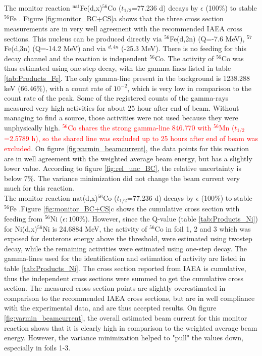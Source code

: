 \noindent
The monitor reaction  $^\text{nat}$Fe(d,x)$^{56}$Co ($t_{1/2}$=77.236 d) decays by $\epsilon$ (100\%) to stable $^{56}$Fe \cite{Junde2011}. Figure \ref{fig:monitor_BC+CS}a shows that the three cross section measurements are in very well agreement with the recommended IAEA cross sections\cite{Hermanne2018a}. This nucleus can be produced directly via $^{56}$Fe(d,2n) (Q=-7.6 MeV), $^{57}$Fe(d,3n) (Q=-14.2 MeV) and via $^{d,4n}$ (-25.3 MeV). There is no feeding for this decay channel and the reaction is independent $^{56}$Co. The activity of $^{56}$Co was thus estimated using one-step decay, with the gamma-lines listed in table \ref{tab:Products_Fe}. The only gamma-line present in the background is 1238.288 keV (66.46\%), with a count rate of $10^{-2}$, which is very low in comparison to the count rate of the peak. Some of the registered counts of the gamma-rays measured very high activities for about 25 hour after end of beam. Without managing to find a source, those activities were not used because they were unphysically high. \textcolor{red}{$^{56}$Co shares the strong gamma-line 846.770 with $^{56}$Mn ($t_{1/2}$=2.5789 h), so the shared line was excluded up to 25 hours after end of beam was excluded}. On figure \ref{fig:varmin_beamcurrent}, the data points for this reaction are in well agreement with the weighted average beam energy, but has a slightly lower value. According to figure \ref{fig:rel_unc_BC}, the relative uncertainty is below 7\%. The variance minimization did not change the beam current very much for this reaction. \\

\noindent 
The monitor reaction $\text{nat}$(d,x)$^{56}$Co ($t_{1/2}$=77.236 d) decays by $\epsilon$ (100\%) to stable $^{56}$Fe \cite{Junde2011}.Figure \ref{fig:monitor_BC+CS}c shows the cumulative cross section with feeding from $^{56}$Ni ($\epsilon:100\%$). However, since the Q-value (table \ref{tab:Products_Ni}) for Ni(d,x)$^{56}$Ni is 24.6884 MeV, the activity of $^{56}$Co in foil 1, 2 and 3 which was exposed for deuterons energy above the threshold, were estimated using twostep decay, while the remaining activities were estimated using one-step decay. The gamma-lines used for the identification and estimation of activity are listed in table \ref{tab:Products_Ni}. The cross section reported from IAEA is cumulative, thus the independent cross sections were summed to get the cumulative cross section. The measured cross section points are slightly overestimated in comparison to the recommended IAEA cross sections, but are in well compliance with the experimental data, and are thus accepted results. On figure \ref{fig:varmin_beamcurrent}, the overall estimated beam current for this monitor reaction shows that it is clearly high in comparison to the weighted average beam energy. However, the variance minimization helped to "pull" the values down, especially in foils 1-3. \\

